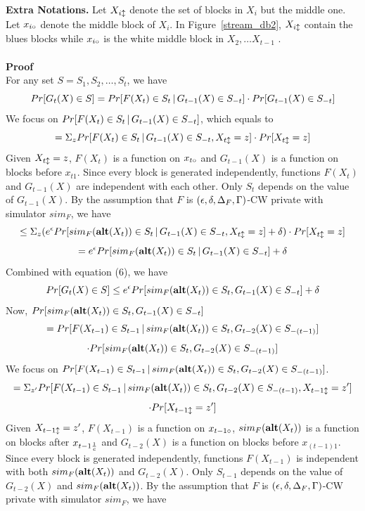 \documentclass[11pt]{article}
\begin{document}
{\bf Extra Notations.} Let $X_{i \updownarrow}$ denote the set of blocks in $X_{i}$ but the middle one. Let $x_{i \circ}$ denote the middle block of $X_{i}$. In Figure~\ref{stream_db2},
$X_{i \updownarrow}$ contain the blues blocks while $x_{i \circ}$ is the white middle block in $X_{2} , \dots X_{t-1}$ .
\\
\\
{\bf Proof}\\
For any set $S=S_{1}, S_{2}, \dots , S_{t}$, we have
\begin{equation}
Pr[G_{t}(X) \in S] = Pr[F(X_{t}) \in S_{t}\,|\, G_{t-1}(X) \in S_{-t}] \cdot Pr[ G_{t-1}(X) \in S_{-t}]
\end{equation}
We focus on $Pr[F(X_{t}) \in S_{t}\,|\, G_{t-1}(X) \in S_{-t}]$, which equals to
\[
=\Sigma_{z} Pr[F(X_{t}) \in S_{t}\,|\, G_{t-1}(X) \in S_{-t} , X_{t \updownarrow}=z]\cdot Pr[X_{t \updownarrow}=z]
\]
Given $X_{t \updownarrow}=z$, $F(X_{t})$ is a function on $x_{t \circ}$ and $G_{t-1}(X)$ is a function on blocks before $x_{t1}$. Since every block is generated independently, functions $F(X_{t})$ and $G_{t-1}(X)$ are independent with each other. Only $S_{t}$ depends on the value of $G_{t-1}(X)$. By the assumption that $F$ is $(\epsilon, \delta, \Delta_{F}, \Gamma)$-CW private with simulator $sim_{F}$, we have
\[
\leq \Sigma_{z} (e^{\epsilon} Pr[sim_{F} ({\bf alt}(X_{t})) \in S_{t}\,|\,G_{t-1}(X) \in S_{-t},  X_{t \updownarrow}=z] + \delta)\cdot Pr[X_{t \updownarrow}=z]
\]
\[
=e^{\epsilon} Pr[sim_{F} ({\bf alt}(X_{t})) \in S_{t}\,|\,G_{t-1}(X) \in S_{-t}] + \delta
\]
Combined with equation (6), we have
\begin{equation}
Pr[G_{t}(X) \in S] \leq e^{\epsilon} Pr[ sim_{F} ({\bf alt}(X_{t})) \in S_{t}, G_{t-1}(X) \in S_{-t}] + \delta
\end{equation}
Now, $Pr[ sim_{F} ({\bf alt}(X_{t})) \in S_{t}, G_{t-1}(X) \in S_{-t}] $
\[
=Pr[F(X_{t-1}) \in S_{t-1}\,|\,sim_{F} ({\bf alt}(X_{t})) \in S_{t}, G_{t-2}(X) \in S_{-(t-1)}]
\]
\begin{equation}
\cdot Pr[sim_{F} ({\bf alt}(X_{t})) \in S_{t}, G_{t-2}(X) \in S_{-(t-1)}]
\end{equation}
We focus on $Pr[F(X_{t-1}) \in S_{t-1}\,|\,sim_{F} ({\bf alt}(X_{t})) \in S_{t}, G_{t-2}(X) \in S_{-(t-1)}]$.
\[
=\Sigma_{z'} Pr[F(X_{t-1}) \in S_{t-1}\,|\,sim_{F} ({\bf alt}(X_{t})) \in S_{t}, G_{t-2}(X) \in S_{-(t-1)}, X_{t-1 \updownarrow}=z']
\] 
\[
\cdot Pr [X_{t-1 \updownarrow}=z']
\]
Given $X_{t-1 \updownarrow}=z'$, $F(X_{t-1})$ is a function on $x_{t-1 \circ}$, $sim_{F} ({\bf alt}(X_{t}))$ is a function on blocks after $x_{t-1 \frac{1}{c}}$ and $G_{t-2}(X)$ is a function on blocks before $x_{(t-1)1}$. Since every block is generated independently, functions $F(X_{t-1})$ is independent with both $sim_{F} ({\bf alt}(X_{t}))$ and $G_{t-2}(X)$. Only $S_{t-1}$ depends on the value of $G_{t-2}(X)$ and $sim_{F} ({\bf alt}(X_{t}))$. By the assumption that $F$ is $(\epsilon, \delta, \Delta_{F}, \Gamma)$-CW private with simulator $sim_{F}$, we have
\end{document}

